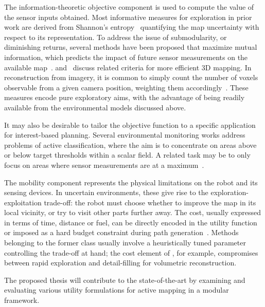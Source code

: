 The information-theoretic objective component is used to compute the value of the sensor inputs 
obtained. Most informative measures for exploration in prior work are derived from Shannon's 
entropy~\cite{Cover2006, Lim2015, Bourgault2002, Yang2014} quantifying the map uncertainty with respect to 
its representation. To address the issue of submodularity, or diminishing returns, several methods have been 
proposed that maximize mutual information, which predicts the impact of future sensor measurements on the 
available map~\cite{Hitz2015, Hollinger2014, Krause2008}. \citet{Charrow2015a} and~\citet{Carrillo2015a} 
discuss related criteria for more efficient 3D mapping. In reconstruction from imagery, it is common to 
simply count the number of voxels observable from a given camera position, weighting them 
accordingly~\cite{Bircher2016, Isler2016, Heng2015}. These measures encode pure exploratory aims, with the 
advantage of being readily available from the environmental models discussed above.

It may also be desirable to tailor the objective function to a specific application for interest-based 
planning. Several environmental monitoring works \cite{Gotovos2013, Hitz2014, Vivaldini2016} address 
problems of active classification, where the aim is to concentrate on areas above or below target thresholds 
within a scalar field. A related task may be to only focus on areas where sensor measurements are at a 
maximum~\cite{Marchant2014}.

The mobility component represents the physical limitations on the robot and its sensing devices. In uncertain 
environments, these give rise to the exploration-exploitation trade-off: the 
robot must choose whether to improve the map in its local vicinity, or try to visit other parts further away. 
The cost, usually expressed in terms of time, distance or fuel, can be directly encoded in the utility 
function~\cite{Charrow2015a, Bircher2016, Heng2015} or imposed as a hard budget constraint during path 
generation~\cite{Hitz2015, Binney2013}. Methods belonging to the former class usually involve a heuristically 
tuned parameter controlling the trade-off at hand; the cost element of \citet{Heng2015}, for example, 
compromises between rapid exploration and detail-filling for volumetric reconstruction.

The proposed thesis will contribute to the state-of-the-art by examining and evaluating various 
utility formulations for active mapping in a modular framework.

